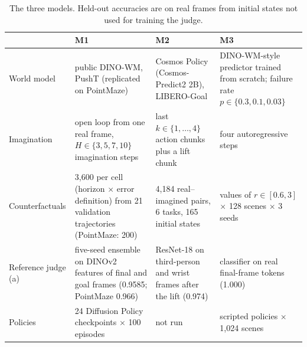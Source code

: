 \documentclass[10pt]{article}
\begin{document}
\begin{table}[t]
\caption{The three models. Held-out accuracies are on real frames from initial states not used for training the judge.}
\label{tab:setup}
\centering\small
\setlength{\tabcolsep}{4pt}
\begin{tabular}{>{\raggedright}p{2.3cm}>{\raggedright}p{3.8cm}>{\raggedright}p{3.8cm}>{\raggedright\arraybackslash}p{3.8cm}}
\toprule
 & M1 & M2 & M3 \\
\midrule
World model & public DINO-WM, PushT (replicated on PointMaze) & Cosmos Policy (Cosmos-Predict2 2B), LIBERO-Goal & DINO-WM-style predictor trained from scratch; failure rate $p\in\{0.3,0.1,0.03\}$ \\
Imagination & open loop from one real frame, $H\in\{3,5,7,10\}$ imagination steps & last $k\in\{1,\dots,4\}$ action chunks plus a lift chunk & four autoregressive steps \\
Counterfactuals & 3,600 per cell (horizon $\times$ error definition) from 21 validation trajectories (PointMaze: 200) & 4,184 real--imagined pairs, 6 tasks, 165 initial states & 49 values of $r\in[0.6,3]$ $\times$ 128 scenes $\times$ 3 seeds \\
Reference judge (a) & five-seed ensemble on DINOv2 features of final and goal frames (0.9585; PointMaze 0.966) & ResNet-18 on third-person and wrist frames after the lift (0.974) & classifier on real final-frame tokens (1.000) \\
Policies & 24 Diffusion Policy checkpoints $\times$ 100 episodes & not run & 6 scripted policies $\times$ 1,024 scenes \\
\bottomrule
\end{tabular}
\end{table}
\end{document}
